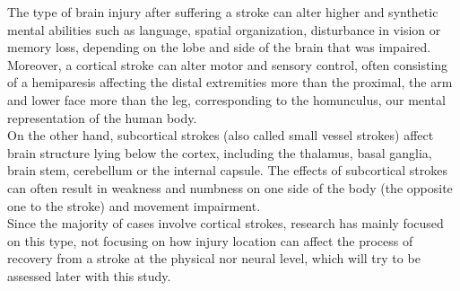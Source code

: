 

The type of brain injury after suffering a stroke can alter higher and synthetic mental abilities such as language, spatial organization, disturbance in vision or memory loss, depending on the lobe and side of the brain that was impaired. Moreover, a cortical stroke can alter motor and sensory control, often consisting of a hemiparesis affecting the distal extremities more than the proximal, the arm and lower face more than the leg, corresponding to the homunculus, our mental representation of the human body. \\
On the other hand, subcortical strokes (also called small vessel strokes) affect brain structure lying below the cortex, including the thalamus, basal ganglia, brain stem, cerebellum or the internal capsule. The effects of subcortical strokes can often result in weakness and numbness on one side of the body (the opposite one to the stroke) and movement impairment. \\
Since the majority of cases involve cortical strokes, research has mainly focused on this type, not focusing on how injury location can affect the process of recovery from a stroke \parencite{Karthikeyan_2019} at the physical nor neural level, which will try to be assessed later with this study. 

